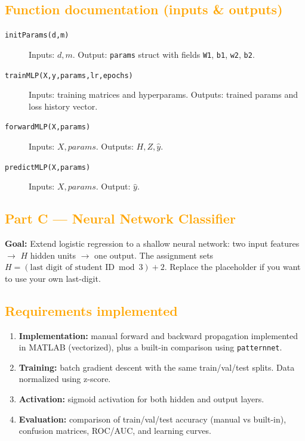 \documentclass[11pt,a4paper]{article}
\begin{document}
\subsection{\textcolor{orange}{Function documentation (inputs \& outputs)}}
\begin{description}
  \item[\texttt{initParams(d,m)}] Inputs: \(d,m\). Output: \texttt{params} struct with fields \texttt{W1}, \texttt{b1}, \texttt{w2}, \texttt{b2}.
  \item[\texttt{trainMLP(X,y,params,lr,epochs)}] Inputs: training matrices and hyperparams. Outputs: trained params and loss history vector.
  \item[\texttt{forwardMLP(X,params)}] Inputs: \(X, params\). Outputs: \(H, Z, \hat y\).
  \item[\texttt{predictMLP(X,params)}] Inputs: \(X, params\). Output: \(\hat y\).
\end{description}



\subsection{\textcolor{orange}{Part C --- Neural Network Classifier}}
\textbf{Goal:} Extend logistic regression to a shallow neural network: two input features $\rightarrow$ $H$ hidden units $\rightarrow$ one output.  
The assignment sets $H=(\text{last digit of student ID} \bmod 3) + 2$. Replace the placeholder if you want to use your own last-digit.

\subsection{\textcolor{orange}{Requirements implemented}}
\begin{enumerate}
  \item \textbf{Implementation:} manual forward and backward propagation implemented in MATLAB (vectorized), plus a built-in comparison using \texttt{patternnet}.
  \item \textbf{Training:} batch gradient descent with the same train/val/test splits. Data normalized using z-score.
  \item \textbf{Activation:} sigmoid activation for both hidden and output layers.
  \item \textbf{Evaluation:} comparison of train/val/test accuracy (manual vs built-in), confusion matrices, ROC/AUC, and learning curves.
\end{enumerate}
\end{document}

